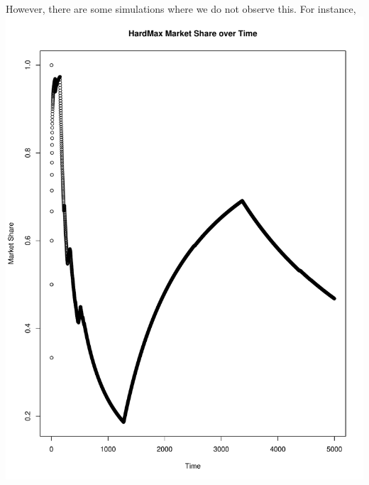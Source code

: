 \documentclass[11pt,letterpaper]{article}
\begin{document}
However, there are some simulations where we do not observe this. For instance, \\
\includegraphics[scale=0.25]{odd_ms_over_time} \\
\end{document}
